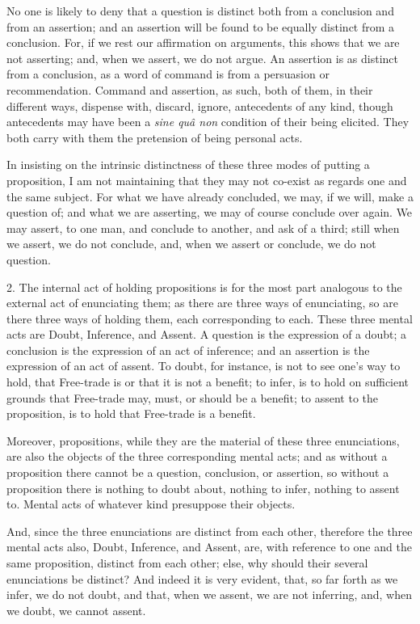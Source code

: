 No one is likely to deny that a question is distinct both from a
conclusion and from an assertion; and an assertion will be found to be
equally distinct from a conclusion. For, if we rest our affirmation on
arguments, this shows that we are not asserting; and, when we assert,
we do not argue. An assertion is as distinct from a conclusion, as a
word of command is from a persuasion or recommendation. Command and
assertion, as such, both of them, in their different ways, dispense
with, discard, ignore, antecedents of any kind, though antecedents may
have been a \emph{sine quâ non} condition of their being elicited.
They both carry with them the pretension of being personal acts.

In insisting on the intrinsic distinctness of these three modes of
putting a proposition, I am not maintaining that they may not co-exist
as regards one and the same subject. For what we have already
concluded, we may, if we will, make a question of; and what we are
asserting, we may of course conclude over again. We may assert, to one
man, and conclude to another, and ask of a third; still when we
assert, we do not conclude, and, when we assert or conclude, we do not
question.

2. The internal act of holding propositions is for the most part
analogous to the external act of enunciating them; as there are three
ways of enunciating, so are there three ways of holding them, each
corresponding to each. These three mental acts are Doubt, Inference,
and Assent. A question is the expression of a doubt; a conclusion is
the expression of an act of inference; and an assertion is the
expression of an act of assent. To doubt, for instance, is not to see
one's way to hold, that Free-trade is or that it is not a benefit; to
infer, is to hold on sufficient grounds that Free-trade may, must, or
should be a benefit; to assent to the proposition, is to hold that
Free-trade is a benefit.

Moreover, propositions, while they are the material of these three
enunciations, are also the objects of the three corresponding mental
acts; and as without a proposition there cannot be a question,
conclusion, or assertion, so without a proposition there is nothing to
doubt about, nothing to infer, nothing to assent to. Mental acts of
whatever kind presuppose their objects.

And, since the three enunciations are distinct from each other,
therefore the three mental acts also, Doubt, Inference, and Assent,
are, with reference to one and the same proposition, distinct from
each other; else, why should their several enunciations be distinct?
And indeed it is very evident, that, so far forth as we infer, we do
not doubt, and that, when we assent, we are not inferring, and,
when we doubt, we cannot assent.

